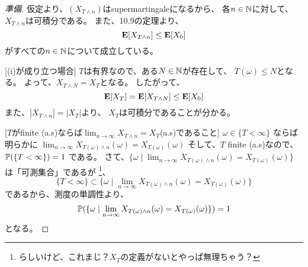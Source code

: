       \begin{proof}
        [準備]
        仮定より、$(X_{T \wedge n})$はsupermartingaleになるから、
        各$n \in {\mathbb{N}}$に対して、$X_{T \wedge n}$は可積分である。
        また、10.9の定理より、
        \[
          {\mathbf{E}}[X_{T \wedge n}] \leq {\mathbf{E}}[X_0]
        \]
        がすべての$n \in {\mathbb{N}}$について成立している。

        [(i)が成り立つ場合]
        $T$は有界なので、ある$N \in {\mathbb{N}}$が存在して、
        $T(\omega) \leq N$となる。
        よって、$X_{T \wedge N} = X_T$となる。
        したがって、
        \[
          {\mathbf{E}}[X_T] = {\mathbf{E}}[X_{T \wedge N}] \leq {\mathbf{E}}[X_0]
        \]
        また、$|X_{T \wedge n}| = |X_T|$より、
        $X_T$は可積分であることが分かる。

        [$T$がfinite (a.s)ならば$\lim_{n \to \infty}X_{T \wedge n} = X_T $(a.s)であること]
        $\omega \in \{T < \infty\}$ ならば明らかに
        $\lim_{n \to \infty}X_{T(\omega) \wedge n}(\omega) = X_{T(\omega)}(\omega) $
        そして、$T$ finite (a.s)なので、${\mathbb{P}}(\{T < \infty\}) = 1$
        である。
        さて、$\{\omega \mid \lim_{n \to \infty}X_{T(\omega) \wedge n}(\omega) = X_{T(\omega)}(\omega)\}$
        は「可測集合」であるが
        \footnote{らしいけど、これまじ？$X_T$の定義がないとやっぱ無理ちゃう？}、
        \[
          \{T < \infty\} \subset \{\omega \mid \lim_{n \to \infty}X_{T(\omega) \wedge n}(\omega) = X_{T(\omega)}(\omega)\}
        \]
        であるから、測度の単調性より、
        \[
          {\mathbb{P}}(\{\omega \mid \lim_{n \to \infty}X_{T(\omega) \wedge n}(\omega) = X_{T(\omega)}(\omega)\}) = 1
        \]
        となる。


\end{proof}
